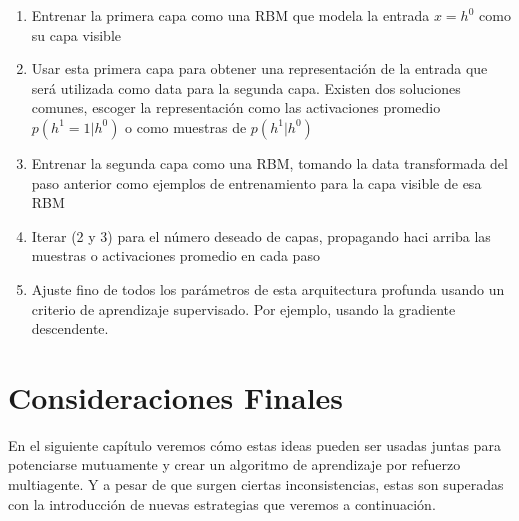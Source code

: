 \begin{enumerate}
\item Entrenar la primera capa como una \ac{RBM} que modela la entrada $x=h^0$ como su capa visible
\item Usar esta primera capa para obtener una representación de la entrada que será utilizada como data para la segunda capa. Existen dos soluciones comunes, escoger la representación como las activaciones promedio $p(h^1=1|h^0)$ o como muestras de $p(h^1|h^0)$
\item Entrenar la segunda capa como una \ac{RBM}, tomando la data transformada del paso anterior como ejemplos de entrenamiento para la capa visible de esa \ac{RBM}
\item Iterar (2 y 3) para el número deseado de capas, propagando haci arriba las muestras o activaciones promedio en cada paso
\item Ajuste fino de todos los parámetros de esta arquitectura profunda usando un criterio de aprendizaje supervisado. Por ejemplo, usando la gradiente descendente.
\end{enumerate}

\section{Consideraciones Finales}

En el siguiente capítulo veremos cómo estas ideas pueden ser usadas juntas para potenciarse mutuamente y crear un algoritmo de aprendizaje por refuerzo multiagente. Y a pesar de que surgen ciertas inconsistencias, estas son superadas con la introducción de nuevas estrategias que veremos a continuación.
